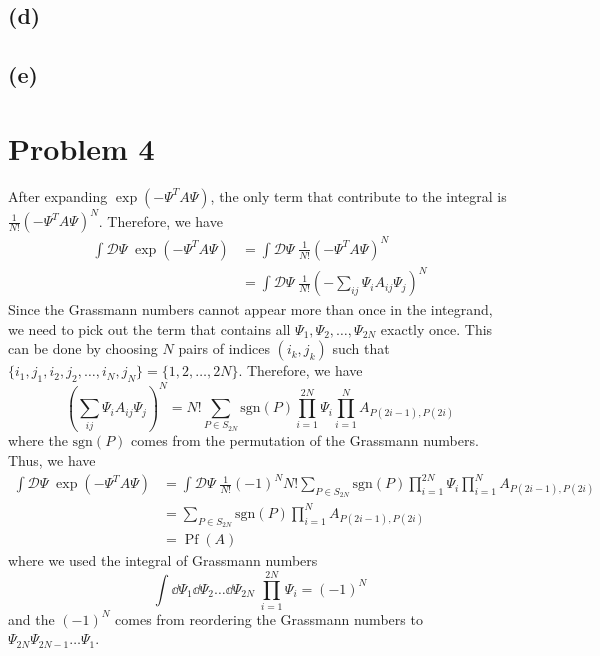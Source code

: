 \documentclass{article}
\begin{document}
\subsection*{(d)}

\subsection*{(e)}

\section*{Problem 4}
After expanding $\exp(-\Psi^T A\Psi)$, the only term that contribute to the integral is $\frac{1}{N!}(-\Psi^T A \Psi)^N$.
Therefore, we have 
\begin{equation}
    \begin{split}
        \int\mathcal{D}\Psi \; \exp(-\Psi^T A \Psi)&=\int\mathcal{D}\Psi \; \frac{1}{N!}(-\Psi^T A \Psi)^N\\
                                                   &=\int\mathcal{D}\Psi \; \frac{1}{N!}\left(-\sum_{ij}\Psi_i A_{ij} \Psi_j\right)^N
    \end{split}
\end{equation}
Since the Grassmann numbers cannot appear more than once in the integrand, we need to pick out the term that contains all $\Psi_1, \Psi_2, \dots, \Psi_{2N}$ exactly once. This can be done by choosing $N$ pairs of indices $(i_k,j_k)$ such that $\{i_1,j_1,i_2,j_2,\dots,i_N,j_N\}=\{1,2,\dots,2N\}$. 
Therefore, we have
\begin{equation}
    \left(\sum_{ij}\Psi_i A_{ij} \Psi_j\right)^N =N! \sum_{P\in S_{2N}} \text{sgn}(P) \prod_{i=1}^{2N} \Psi_i \prod_{i=1}^N A_{P(2i-1),P(2i)}
\end{equation}
where the $\text{sgn}(P)$ comes from the permutation of the Grassmann numbers.
Thus, we have
\begin{equation}
    \begin{split}
        \int\mathcal{D}\Psi \; \exp(-\Psi^T A \Psi)&=\int\mathcal{D}\Psi \; \frac{1}{N!}(-1)^N N! \sum_{P\in S_{2N}} \text{sgn}(P) \prod_{i=1}^{2N} \Psi_i \prod_{i=1}^N A_{P(2i-1),P(2i)}\\
                                                   &=\sum_{P\in S_{2N}} \text{sgn}(P) \prod_{i=1}^N A_{P(2i-1),P(2i)}\\
                                                   &=\operatorname{Pf}(A)
    \end{split}
\end{equation}
where we used the integral of Grassmann numbers 
\begin{equation}
    \int\dd{\Psi_1}\dd{\Psi_2}\dots\dd{\Psi_{2N}} \; \prod_{i=1}^{2N} \Psi_i = (-1)^N
\end{equation}
and the $(-1)^N$ comes from reordering the Grassmann numbers to $\Psi_{2N}\Psi_{2N-1}\dots\Psi_1$.




%
%
\end{document}
